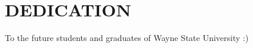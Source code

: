 \section*{DEDICATION}
\begin{center}
To the future students and graduates of Wayne State University :)
\end{center}